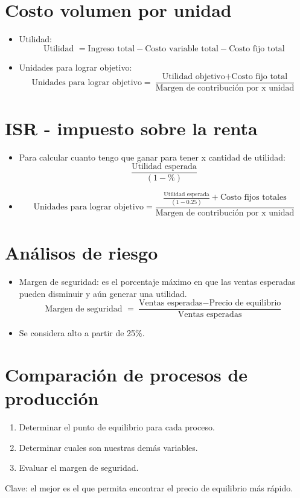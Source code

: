 \section{Costo volumen por unidad}
\begin{itemize}
    \item Utilidad:  
    \[
      \text{Utilidad } = \text{Ingreso total} - \text{Costo variable total} - \text{Costo fijo total}
    \]
    
    \item Unidades para lograr objetivo: 
        \[
         \text{Unidades para lograr objetivo} = \frac{\text{Utilidad objetivo} + \text{Costo fijo total}}{\text{Margen de contribución por x unidad}} 
        \]
\end{itemize}

\section{ISR - impuesto sobre la renta}
\begin{itemize}
    \item Para calcular cuanto tengo que ganar para tener x cantidad de utilidad:
        \[
          \frac{\text{Utilidad esperada}}{(1-\%)} 
        \]
    
    \item 
        \[
          \text{Unidades para lograr objetivo} = \frac{\frac{\text{Utilidad esperada}}{(1-0.25)} + \text{Costo fijos totales}}{\text{Margen de contribución por x unidad}} 
        \]
\end{itemize}

\section{Análisos de riesgo}
\begin{itemize}
    \item Margen de seguridad: es el porcentaje máximo en que las ventas esperadas pueden disminuir y aún generar una utilidad.
        \[
          \text{Margen de seguridad } = \frac{\text{Ventas esperadas} - \text{Precio de equilibrio}}{\text{Ventas esperadas}} 
        \]
    
    \item Se considera alto a partir de 25\%. 
\end{itemize}


\section{Comparación de procesos de producción}
\begin{enumerate}
    \item Determinar el punto de equilibrio para cada proceso.
    \item Determinar cuales son nuestras demás variables.
    \item Evaluar el margen de seguridad.
\end{enumerate}
Clave: el mejor es el que permita encontrar el precio de equilibrio más rápido.
